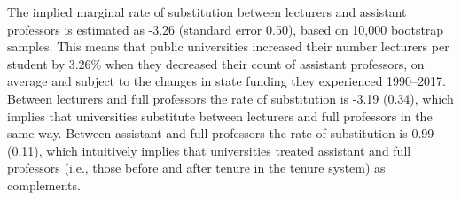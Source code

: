 The implied marginal rate of substitution between lecturers and assistant professors is estimated as -3.26 (standard error 0.50), based on 10,000 bootstrap samples.
This means that public universities increased their number lecturers per student by 3.26\% when they decreased their count of assistant professors, on average and subject to the changes in state funding they experienced 1990--2017.
Between lecturers and full professors the rate of substitution is -3.19 (0.34), which implies that universities substitute between lecturers and full professors in the same way.
Between assistant and full professors the rate of substitution is 0.99 (0.11), which intuitively implies that universities treated assistant and full professors (i.e., those before and after tenure in the tenure system) as complements.

%                                                                      
%                                                                      
%                                                                      
%                                                                      

                                                                      
%                                                                       
%                                                                       
%                                                                       
%                                                                       

